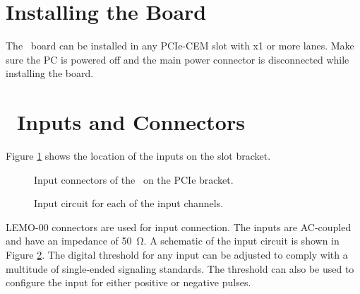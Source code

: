 \section{Installing the Board}
The \deviceName\ board can be installed in any PCIe-CEM slot with x1 or more lanes. 
Make sure the PC is powered off and the main power connector is disconnected while installing the board.\par

%
\section{\deviceName\ Inputs and Connectors}
	Figure \ref{fig:bracket} shows the location of the inputs on the slot bracket.
%
	\begin{figure}[hb]
		\begin{center}
			\caption{Input connectors of the \deviceName\ on the PCIe bracket.\label{fig:bracket}}
		\end{center}
	\end{figure}
	\begin{figure}[hb]
		\begin{center}
			\caption{Input circuit for each of the input channels.\label{fig:inputcirc}}
		\end{center}
	\end{figure}

	LEMO-00 connectors are used for input connection. The inputs are AC-coupled and have an impedance of \SI{50}{\ohm}. 
	A schematic of the input circuit is shown in Figure \ref{fig:inputcirc}. 
	The digital threshold for any input can be adjusted to comply with a multitude of single-ended signaling standards.
	The threshold can also be used to configure the input for either positive or negative pulses.
	

